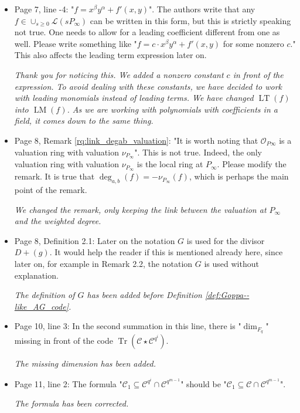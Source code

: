 \documentclass[12pt,a4paper]{amsart}
\DeclareMathOperator{\trace}{Tr}
\newcommand{\calC}{\mathcal{C}}
\newcommand{\Tr}[1]{\trace\!\left(#1\right)}
\begin{document}
\begin{itemize}
\item Page 7, line -4: "$f=x^\beta y^\alpha+f'(x,y)$". The authors write that any $f \in \cup_{s \ge 0} \mathcal{L}(sP_\infty)$ can be written in this form, but this is strictly speaking not true. One needs to allow for a leading coefficient different from one as well. Please write something like "$f=c\cdot x^\beta y^\alpha+f'(x,y)$ for some nonzero $c$." This also affects the leading term expression later on.

\textit{Thank you for noticing this. We added a nonzero constant $c$ in front of the expression. To avoid dealing with these constants, we have decided to work with leading \emph{monomials} instead of leading terms. We have changed $\operatorname{LT}(f)$ into $\operatorname{LM}(f)$. As we are working with polynomials with coefficients in a field, it comes down to the same thing.}

\item Page 8, Remark \ref{rq:link_degab_valuation}: "It is worth noting that $\mathcal{O}_{P\infty}$ is a valuation ring with valuation $\nu_{P_\infty}$". This is not true. Indeed, the only valuation ring with valuation $\nu_{P_\infty}$ is the local ring at $P_\infty$. Please modify the remark. It is true that $\deg_{a,b}(f)=-\nu_{P_\infty}(f)$, which is perhaps the main point of the remark.

\textit{We changed the remark, only keeping the link between the valuation at $P_\infty$ and the weighted degree.}


\item Page 8, Definition 2.1: Later on the notation $G$ is used for the divisor $D+(g)$. It would help the reader if this is mentioned already here, since later on, for example in Remark 2.2, the notation $G$ is used without explanation.

\textit{The definition of $G$ has been added before Definition \ref{def:Goppa--like_AG_code}.}


\item Page 10, line 3: In the second summation in this line, there is "$\dim_{F_{q}}$" missing in front of the code $\Tr{\calC \star \calC^{q^i}}$.

\textit{The missing dimension has been added.}

\item Page 11, line 2: The formula "$\calC_1 \subseteq \calC^{q^i} \cap \calC^{q^{m-1}}$" should be "$\calC_1 \subseteq \calC \cap \calC^{q^{m-1}}$". 

\textit{The formula has been corrected.}


\end{itemize}
\end{document}

